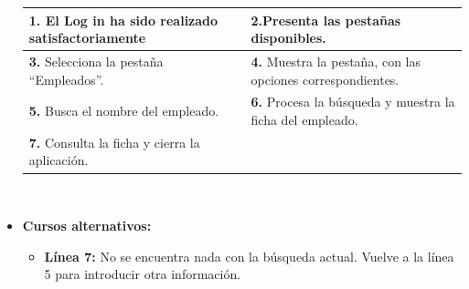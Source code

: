 \documentclass[spanish,a4paper,11pt, twoside]{report}	%
\begin{document}
\begin{itemize}
\begin{tabular}{|p{6cm}||p{6cm}|}
				\textbf{1.} El Log in ha sido realizado satisfactoriamente & \textbf{2.}Presenta las pestañas disponibles.\\ \hline 
				\textbf{3.} Selecciona la pestaña “Empleados”. & \textbf{4.} Muestra la pestaña, con las opciones correspondientes. \\ \hline
				\textbf{5.} Busca el nombre del empleado.	& \textbf{6.} Procesa la búsqueda y muestra la ficha del empleado. \\ \hline
				\textbf{7.} Consulta la ficha y cierra la aplicación.  & \textbf{} \\ \hline
			\end{tabular}
			\\
			\item \textbf{Cursos alternativos:} 
			\begin{itemize}
			\item  \textbf{Línea 7:} No se encuentra nada con la búsqueda actual. Vuelve a la línea 5 para introducir otra información.
			\end {itemize}
		\end{itemize}

\end{document}
